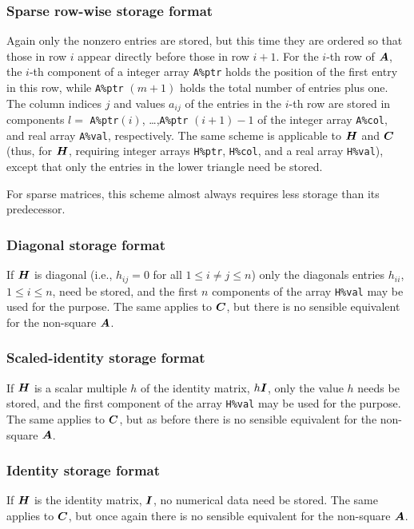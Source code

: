 \documentclass{galahad}
\begin{document}
\subsubsection{Sparse row-wise storage format}\label{rowwise}
Again only the nonzero entries are stored, but this time
they are ordered so that those in row $i$ appear directly before those
in row $i+1$. For the $i$-th row of ${\bm{A}}$, the $i$-th component of a
integer array {\tt A\%ptr} holds the position of the first entry in this row,
while {\tt A\%ptr} $(m+1)$ holds the total number of entries plus one.
The column indices $j$ and values $a_{ij}$ of the entries in the $i$-th row
are stored in components
$l =$ {\tt A\%ptr}$(i)$, \ldots ,{\tt A\%ptr} $(i+1)-1$ of the
integer array {\tt A\%col}, and real array {\tt A\%val}, respectively.
The same scheme is applicable to
${\bm{H}}$ and ${\bm{C}}$ (thus, for ${\bm{H}}$,
requiring integer arrays {\tt H\%ptr}, {\tt H\%col}, and
a real array {\tt H\%val}),
except that only the entries in the lower triangle need be stored.

For sparse matrices, this scheme almost always requires less storage than
its predecessor.

\subsubsection{Diagonal storage format}\label{diagonal}
If ${\bm{H}}$ is diagonal (i.e., $h_{ij} = 0$ for all $1 \leq i \neq j \leq n$)
only the diagonals entries $h_{ii}$, $1 \leq i \leq n$,  need be stored,
and the first $n$ components of the array {\tt H\%val} may be used for
the purpose. The same applies to ${\bm{C}}$, but
there is no sensible equivalent for the non-square ${\bm{A}}$.

\subsubsection{Scaled-identity storage format}\label{scaled}
If ${\bm{H}}$ is a scalar multiple $h$ of the identity matrix, $h {\bm{I}}$,
only the value $h$ needs be stored,
and the first component of the array {\tt H\%val}
 may be used for
the purpose. The same applies to ${\bm{C}}$, but
as before there is no sensible equivalent for the non-square ${\bm{A}}$.

\subsubsection{Identity storage format}\label{identity}
If ${\bm{H}}$ is the identity matrix, ${\bm{I}}$,
no numerical data need be stored. The same applies to ${\bm{C}}$, but
once again there is no sensible equivalent for the non-square ${\bm{A}}$.
\end{document}
